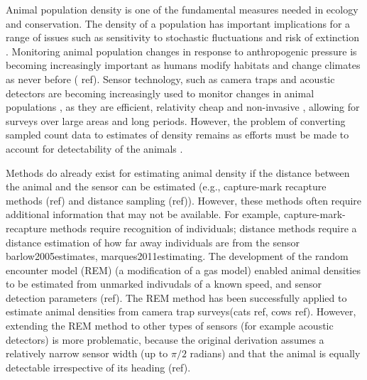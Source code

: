 Animal population density is one of the fundamental measures needed in ecology and conservation. The density of a population has important implications for a range of issues such as sensitivity to stochastic fluctuations \citep{richter1972extinction, wright1983stochastic} and risk of extinction \citep{purvis2000predicting}. Monitoring animal population changes in response to anthropogenic pressure is becoming increasingly important as humans modify habitats and change climates as never before (\citep{everatt2014trophic} ref). Sensor technology, such as camera traps \citep{rowcliffe2008surveys, karanth1995Estimating} and acoustic detectors \citep{ofarrel1999comparison,mellinger2007fixed,walters2012continental} are becoming increasingly used to monitor changes in animal populations \citep{rowcliffe2008surveys, kessel2014review}, as they are efficient, relativity cheap and non-invasive \citep{gese2001monitoring, o2003crouching, silveira2003camera}, allowing for surveys over large areas and long periods. However, the problem of converting sampled count data to estimates of density remains as efforts must be made to account for detectability of the animals \citep{dail2011models, chandler2011inference, solymos2013calibrating}.


Methods do already exist for estimating animal density if the distance between the animal and the sensor can be estimated (e.g., capture-mark recapture methods (ref) and distance sampling (ref)). However, these methods often require additional information that may not be available. For example, capture-mark-recapture methods \citep{karanth1995, trolle2003estimation, soisalo2006estimating, trolle2007camera} require recognition of individuals; distance methods require a distance estimation of how far away individuals are from the sensor {barlow2005estimates, marques2011estimating}. The development of the random encounter model (REM) (a modification of a gas model) enabled animal densities to be estimated from unmarked indivudals of a known speed, and sensor detection parameters (ref). The REM method has been successfully applied to estimate animal densities from camera trap surveys(cats ref, cows ref). However, extending the REM method to other types of sensors (for example acoustic detectors) is more problematic, because the original derivation assumes a relatively narrow sensor width (up to $\pi/2$ radians) and that the animal is equally detectable irrespective of its heading (ref).


